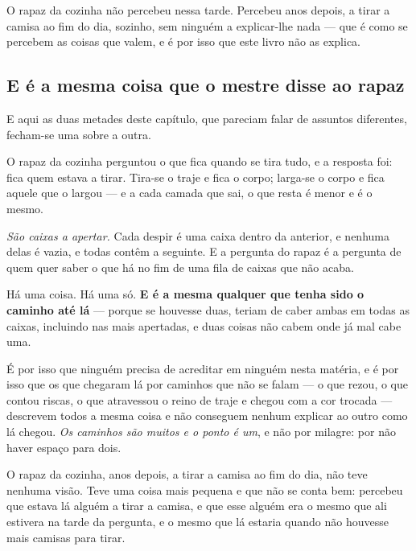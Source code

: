 \documentclass[livro.tex]{subfiles}
\begin{document}
\medskip

O rapaz da cozinha não percebeu nessa tarde. Percebeu anos depois, a tirar a camisa ao fim do dia,
sozinho, sem ninguém a explicar-lhe nada --- que é como se percebem as coisas que valem, e é por
isso que este livro não as explica.



\subsection*{E é a mesma coisa que o mestre disse ao rapaz}

E aqui as duas metades deste capítulo, que pareciam falar de assuntos diferentes, fecham-se uma
sobre a outra.

\medskip

O rapaz da cozinha perguntou o que fica quando se tira tudo, e a resposta foi: fica quem estava a
tirar. Tira-se o traje e fica o corpo; larga-se o corpo e fica aquele que o largou --- e a cada
camada que sai, o que resta é menor e é o mesmo.

\medskip

\emph{São caixas a apertar.} Cada despir é uma caixa dentro da anterior, e nenhuma delas é vazia,
e todas contêm a seguinte. E a pergunta do rapaz é a pergunta de quem quer saber o que há no fim
de uma fila de caixas que não acaba.

\medskip

Há uma coisa. Há uma só. \textbf{E é a mesma qualquer que tenha sido o caminho até lá} --- porque
se houvesse duas, teriam de caber ambas em todas as caixas, incluindo nas mais apertadas, e duas
coisas não cabem onde já mal cabe uma.

\medskip

É por isso que ninguém precisa de acreditar em ninguém nesta matéria, e é por isso que os que
chegaram lá por caminhos que não se falam --- o que rezou, o que contou riscas, o que atravessou
o reino de traje e chegou com a cor trocada --- descrevem todos a mesma coisa e não conseguem
nenhum explicar ao outro como lá chegou. \emph{Os caminhos são muitos e o ponto é um}, e não por
milagre: por não haver espaço para dois.

\medskip

O rapaz da cozinha, anos depois, a tirar a camisa ao fim do dia, não teve nenhuma visão. Teve uma
coisa mais pequena e que não se conta bem: percebeu que estava lá alguém a tirar a camisa, e que
esse alguém era o mesmo que ali estivera na tarde da pergunta, e o mesmo que lá estaria quando
não houvesse mais camisas para tirar.
\end{document}
